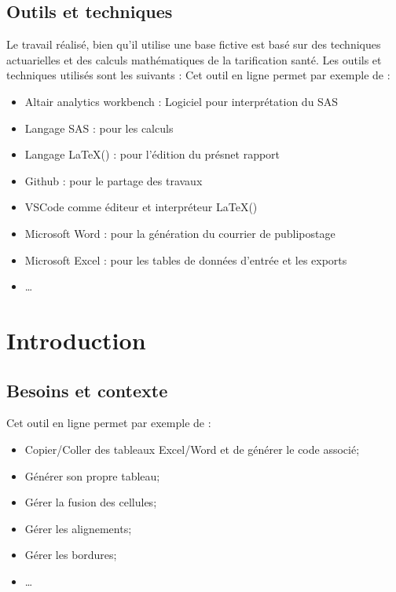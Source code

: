 \documentclass[a4paper,12pt]{report}
\begin{document}
\subsection{Outils et techniques}
Le travail réalisé, bien qu'il utilise une base fictive est basé sur des techniques actuarielles 
et des calculs mathématiques de la tarification santé.
Les outils et techniques utilisés sont les suivants : 
Cet outil en ligne permet par exemple de :
\begin{itemize}
\item Altair analytics workbench : Logiciel pour interprétation du SAS
\item Langage SAS : pour les calculs 
\item Langage \LaTeX() : pour l'édition du présnet rapport
\item Github : pour le partage des travaux 
\item VSCode comme éditeur et interpréteur \LaTeX()
\item Microsoft Word : pour la génération du courrier de publipostage
\item Microsoft Excel : pour les tables de données d'entrée et les exports 
\item \ldots
\end{itemize}



\section{Introduction}
\subsection{Besoins et contexte}

Cet outil en ligne permet par exemple de :
\begin{itemize}
\item Copier/Coller des tableaux Excel/Word et de générer le code associé;
\item Générer son propre tableau;
\item Gérer la fusion des cellules;
\item Gérer les alignements;
\item Gérer les bordures;
\item \ldots
\end{itemize}
\end{document}
